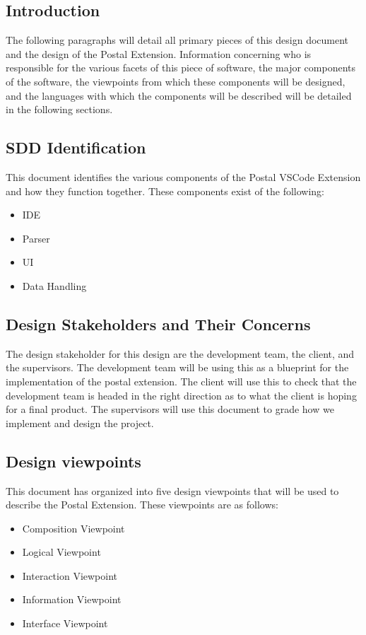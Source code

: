 \documentclass[letterpaper,10pt,titlepage,draftclsnofoot,onecolumn,onesided] {IEEEtran}
\begin{document}
\subsection{Introduction}
The following paragraphs will detail all primary pieces of this design document and the design of the Postal Extension. 
Information concerning who is responsible for the various facets of this piece of software, the major components of the software, the viewpoints from which these components will be designed, and the languages with which the components will be described will be detailed in the following sections.

\subsection{SDD Identification}
This document identifies the various components of the Postal VSCode Extension and how they function together. These components exist of the following:
\begin{itemize}
	\item IDE
	\item Parser
	\item UI
	\item Data Handling
\end{itemize}

\subsection{Design Stakeholders and Their Concerns}
The design stakeholder for this design are the development team, the client, and the supervisors.
The development team will be using this as a blueprint for the implementation of the postal extension. 
The client will use this to check that the development team is headed in the right direction as to what the client is hoping for a final product.
The supervisors will use this document to grade how we implement and design the project.

\subsection{Design viewpoints}
This document has organized into five design viewpoints that will be used to describe the Postal Extension.
These viewpoints are as follows:
\begin {itemize}
	\item Composition Viewpoint
	\item Logical Viewpoint
	\item Interaction Viewpoint
	\item Information Viewpoint
	\item Interface Viewpoint
\end {itemize}
\end{document}
